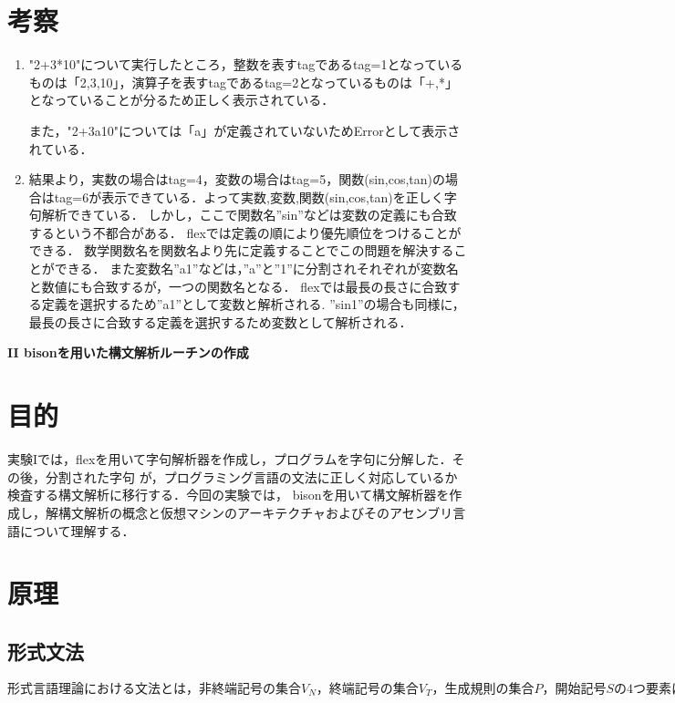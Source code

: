 \documentclass[a4j]{jsarticle}  %
\begin{document}
\section{考察}
\begin{enumerate}
\item "2+3*10"について実行したところ，整数を表すtagであるtag=1となっているものは「2,3,10」，演算子を表すtagであるtag=2となっているものは「+,*」となっていることが分るため正しく表示されている．

また，"2+3a10"については「a」が定義されていないためErrorとして表示されている．

\item 結果より，実数の場合はtag=4，変数の場合はtag=5，関数(sin,cos,tan)の場合はtag=6が表示できている．よって実数,変数,関数(sin,cos,tan)を正しく字句解析できている．
しかし，ここで関数名”sin”などは変数の定義にも合致するという不都合がある．
flexでは定義の順により優先順位をつけることができる．
数学関数名を関数名より先に定義することでこの問題を解決することができる．
また変数名”a1”などは，”a”と”1”に分割されそれぞれが変数名と数値にも合致するが，一つの関数名となる．
flexでは最長の長さに合致する定義を選択するため”a1”として変数と解析される.
”sin1”の場合も同様に，最長の長さに合致する定義を選択するため変数として解析される． 
\end{enumerate}







\newpage
\begin{center}
 {\Large \bf II bisonを用いた構文解析ルーチンの作成}
\end{center}


\section{目的}
実験Iでは，flexを用いて字句解析器を作成し，プログラムを字句に分解した．その後，分割された字句
が，プログラミング言語の文法に正しく対応しているか検査する構文解析に移行する．今回の実験では，
bisonを用いて構文解析器を作成し，解構文解析の概念と仮想マシンのアーキテクチャおよびそのアセンブリ言語について理解する．


\section{原理}
\subsection{形式文法}
$形式言語理論における文法とは，非終端記号の集合V_N，終端記号の集合V_T，生成規則の集合P，開始記号Sの4つ要素によって構成される4つ組G=(V_N,V_T,P,S)である．$
\end{document}
